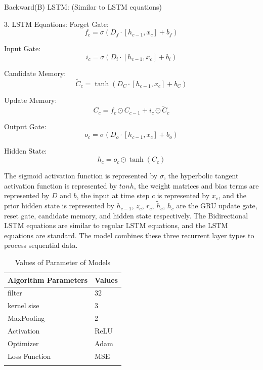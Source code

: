 \documentclass[a4paper,fleqn]{cas-sc}
\begin{document}
Backward(B) LSTM:
(Similar to LSTM equations)

3. LSTM Equations:
Forget Gate:
\begin{equation}
f_c = \sigma(D_f \cdot [h_{c-1}, x_c] + b_f)
\end{equation}

Input Gate:
\begin{equation}
i_c = \sigma(D_i \cdot [h_{c-1}, x_c] + b_i)
\end{equation}

Candidate Memory:
\begin{equation}
\tilde{C}_c = \tanh(D_C \cdot [h_{c-1}, x_c] + b_C)
\end{equation}

Update Memory:
\begin{equation}
C_c = f_c \odot C_{c-1} + i_c \odot \tilde{C}_c
\end{equation}

Output Gate:
\begin{equation}
o_c = \sigma(D_o \cdot [h_{c-1}, x_c] + b_o)
\end{equation}

Hidden State:
\begin{equation}
h_c = o_c \odot \tanh(C_c)
\end{equation}

The sigmoid activation function is represented by $\sigma$, the hyperbolic tangent activation function is represented by $tanh$, the weight matrices and bias terms are represented by $D$ and $b$, the input at time step $c$ is represented by $x_c$, and the prior hidden state is represented by $h_{c-1}$, $z_c$, $r_c$, $\tilde{h}_c$, $h_c$ are the GRU update gate, reset gate, candidate memory, and hidden state respectively. The Bidirectional LSTM equations are similar to regular LSTM equations, and the LSTM equations are standard. The model combines these three recurrent layer types to process sequential data.



\begin{table}[!ht]
\centering
\caption{Values of Parameter of Models}
\begin{tabular}{|p{}| p{}|}
\hline
Algorithm Parameters & Values \\ \hline
filter & 32 \\
kernel sise & 3 \\
MaxPooling & 2 \\
Activation & ReLU \\
Optimizer & Adam \\
Loss Function & MSE \\ \hline
\label{Table 2}
\end{tabular}
\end{table}
\end{document}
